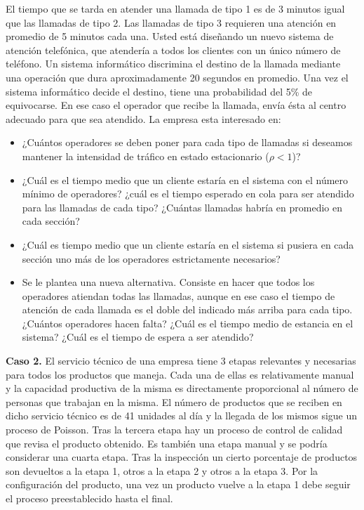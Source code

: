 \documentclass[
]{book}
\providecommand{\tightlist}{%
  \setlength{\itemsep}{0pt}\setlength{\parskip}{0pt}}
\theoremstyle{definition}
\theoremstyle{definition}
\theoremstyle{definition}
\theoremstyle{definition}
\theoremstyle{remark}
\begin{document}
El tiempo que se tarda en atender una llamada de tipo 1 es de 3 minutos igual que las llamadas de tipo 2. Las llamadas de tipo 3 requieren una atención en promedio de 5 minutos cada una. Usted está diseñando un nuevo sistema de atención telefónica, que atendería a todos los clientes con un único número de teléfono. Un sistema informático discrimina el destino de la llamada mediante una operación que dura aproximadamente 20 segundos en promedio. Una vez el sistema informático decide el destino, tiene una probabilidad del 5\% de equivocarse. En ese caso el operador que recibe la llamada, envía ésta al centro adecuado para que sea atendido. La empresa esta interesado en:

\begin{itemize}
\tightlist
\item
  ¿Cuántos operadores se deben poner para cada tipo de llamadas si deseamos mantener la intensidad de tráfico en estado estacionario (\(\rho < 1\))?
\item
  ¿Cuál es el tiempo medio que un cliente estaría en el sistema con el número mínimo de operadores? ¿cuál es el tiempo esperado en cola para ser atendido para las llamadas de cada tipo? ¿Cuántas llamadas habría en promedio en cada sección?
\item
  ¿Cuál es tiempo medio que un cliente estaría en el sistema si pusiera en cada sección uno más de los operadores estrictamente necesarios?
\item
  Se le plantea una nueva alternativa. Consiste en hacer que todos los operadores atiendan todas las llamadas, aunque en ese caso el tiempo de atención de cada llamada es el doble del indicado más arriba para cada tipo. ¿Cuántos operadores hacen falta? ¿Cuál es el tiempo medio de estancia en el sistema? ¿Cuál es el tiempo de espera a ser atendido?
\end{itemize}

\textbf{Caso 2.} El servicio técnico de una empresa tiene 3 etapas relevantes y necesarias para todos los productos que maneja. Cada una de ellas es relativamente manual y la capacidad productiva de la misma es directamente proporcional al número de personas que trabajan en la misma. El número de productos que se reciben en dicho servicio técnico es de 41 unidades al día y la llegada de los mismos sigue un
proceso de Poisson. Tras la tercera etapa hay un proceso de control de calidad que revisa el producto
obtenido. Es también una etapa manual y se podría considerar una cuarta etapa. Tras la inspección un cierto porcentaje de productos son devueltos a la etapa 1, otros a la etapa 2 y otros a la etapa 3. Por la configuración del producto, una vez un producto vuelve a la etapa 1 debe seguir el proceso preestablecido hasta el final.
\end{document}
